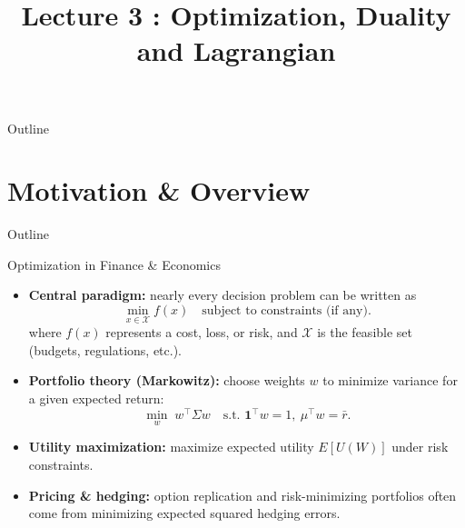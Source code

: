 \documentclass[aspectratio=169]{beamer}
\title{Lecture 3 : Optimization, Duality and Lagrangian}
\institute{NYU Tandon School, Finance and Risk Engineering}
\begin{document}
\maketitle

\begin{frame}{Outline}
  \tableofcontents[hideallsubsections]
\end{frame}

\section{Motivation \& Overview}

\begin{frame}{Outline}
\end{frame}

\begin{frame}{Optimization in Finance \& Economics}

\begin{itemize}
  \item \textbf{Central paradigm:} nearly every decision problem can be written as
  \[
  \min_{x\in\mathcal{X}} f(x)
  \quad \text{subject to constraints (if any).}
  \]
  where \(f(x)\) represents a cost, loss, or risk,  
  and \(\mathcal{X}\) is the feasible set (budgets, regulations, etc.).
\pause
  \vspace{0.5em}

  \item \textbf{Portfolio theory (Markowitz):}  
  choose weights \(w\) to minimize variance for a given expected return:
  \[
  \min_{w}\; w^\top \Sigma w
  \quad \text{s.t. } \mathbf{1}^\top w = 1,\ \mu^\top w = \bar{r}.
  \]

  \vspace{0.5em}
\pause
  \item \textbf{Utility maximization:}  
  maximize expected utility \(E[U(W)]\) under risk constraints.

  \vspace{0.5em}

  \item \textbf{Pricing \& hedging:}  
  option replication and risk-minimizing portfolios often come from minimizing expected squared hedging errors.

\end{itemize}

\end{frame}
\end{document}
